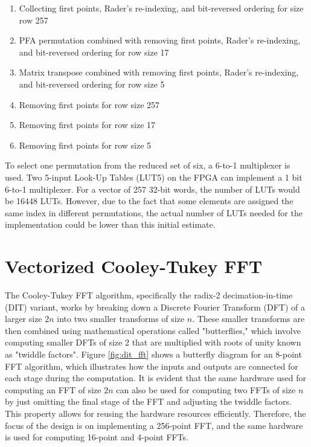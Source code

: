 \documentclass[english,master=eelt,masteroption=ec]{kulemt}
\begin{document}
\begin{samepage}
\begin{enumerate}
\item{Collecting first points, Rader's re-indexing, and bit-reversed ordering for size row 257}
\item{PFA permutation combined with removing first points, Rader's re-indexing, and bit-reversed ordering for row size 17}
\item{Matrix transpose combined with removing first points, Rader's re-indexing, and bit-reversed ordering for row size 5}
\item{Removing first points for row size 257}
\item{Removing first points for row size 17}
\item{Removing first points for row size 5}
\end{enumerate}
\end{samepage}

To select one permutation from the reduced set of six, a 6-to-1 multiplexer is used. Two 5-input Look-Up Tables (LUT5) on the FPGA can implement a 1 bit 6-to-1 multiplexer. For a vector of 257 32-bit words, the number of LUTs would be 16448 LUTs. However, due to the fact that some elements are assigned the same index in different permutations, the actual number of LUTs needed for the implementation could be lower than this initial estimate.

\section{Vectorized Cooley-Tukey FFT}
The Cooley-Tukey FFT algorithm, specifically the radix-2 decimation-in-time (DIT) variant, works by breaking down a Discrete Fourier Transform (DFT) of a larger size $2n$ into two smaller transforms of size $n$. These smaller transforms are then combined using mathematical operations called "butterflies," which involve computing smaller DFTs of size 2 that are multiplied with roots of unity known as "twiddle factors". Figure \ref{fig:dit_fft} shows a butterfly diagram for an 8-point FFT algorithm, which illustrates how the inputs and outputs are connected for each stage during the computation. It is evident that the same hardware used for computing an FFT of size $2n$ can also be used for computing two FFTs of size $n$ by just omitting the final stage of the FFT and adjusting the twiddle factors. This property allows for reusing the hardware resources efficiently. Therefore, the focus of the design is on implementing a 256-point FFT, and the same hardware is used for computing 16-point and 4-point FFTs.
\end{document}
